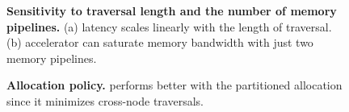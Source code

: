 \begin{figure}[!ht]
    \centering
    \caption[Sensitivity to traversal length and the number of memory pipelines]{\textbf{Sensitivity to traversal length and the number of memory pipelines.} (a) \pulse latency scales linearly with the length of traversal. (b) \pulse accelerator can saturate memory bandwidth with just two \pulse memory pipelines.}
\end{figure}
    

\begin{figure}[b]
\centering
  \caption[Allocation policy]{\textbf{Allocation policy.} \pulse performs better with the partitioned allocation since it minimizes cross-node traversals.}
\end{figure}


